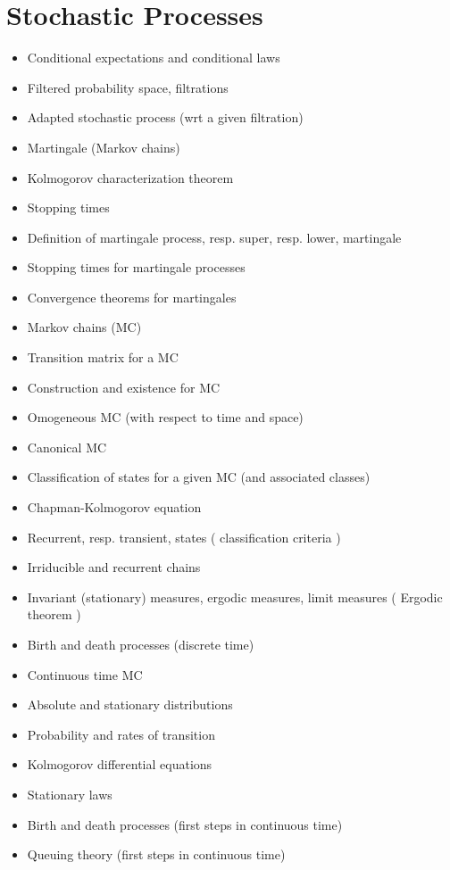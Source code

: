 \documentclass[10pt]{article}
\begin{document}
\section{Stochastic Processes}
\begin{itemize}
	\item Conditional expectations and conditional laws 
	\item Filtered probability space, filtrations 
	\item Adapted stochastic process (wrt a given filtration) 
	\item Martingale (Markov chains) 
	\item Kolmogorov characterization theorem 
	\item Stopping times 
	\item Definition of martingale process, resp. super, resp. lower, martingale 
	\item Stopping times for martingale processes 
	\item Convergence theorems for martingales 
	\item Markov chains (MC) 
	\item Transition matrix for a MC 
	\item Construction and existence for MC 
	\item Omogeneous MC (with respect to time and space)
	\item Canonical MC 
	\item Classification of states for a given MC (and associated classes) 
	\item Chapman-Kolmogorov equation 
	\item Recurrent, resp. transient, states ( classification criteria ) 
	\item Irriducible and recurrent chains 
	\item Invariant (stationary) measures, ergodic measures, limit measures ( Ergodic theorem ) 
	\item Birth and death processes (discrete time) 
	\item Continuous time MC 
	\item Absolute and stationary distributions 
	\item Probability and rates of transition 
	\item Kolmogorov differential equations 
	\item Stationary laws 
	\item Birth and death processes (first steps in continuous time) 
	\item Queuing theory (first steps in continuous time) 

\end{itemize}
\end{document}
